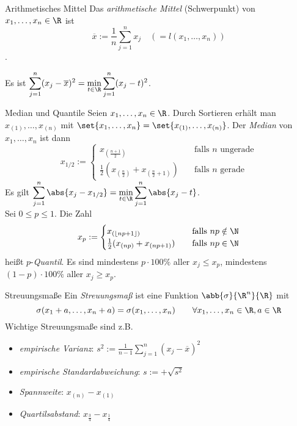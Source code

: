 \begin{karte}{Arithmetisches Mittel}
	Das \textit{arithmetische Mittel} (Schwerpunkt) von $x_1,\dotsc,x_n \in \R$ ist $$ \overline{x} := \frac{1}{n}\sum_{j=1}^{n} x_j \quad (= l(x_1,\dotsc,x_n))$$.
	
	Es ist $\displaystyle \sum_{j=1}^{n} (x_j-\overline{x})^2 = 
	\min_{t \in \R} \sum_{j=1}^{n} (x_j-t)^2$.
\end{karte}
\begin{karte}{Median und Quantile}
	Seien $x_1,\dotsc,x_n \in \R$. Durch Sortieren erhält man $ x_{(1)},\dotsc,x_{(n)}$ mit $\set{x_1,\dotsc,x_n} = \set{x_{(1)},\dotsc,x_{(n)}}$. Der \textit{Median} von $x_1,\dotsc,x_n$ ist dann
	$$x_{1/2}:= \begin{cases}
	x_{(\frac{n+1}{2})} & \quad \text{falls } n \text{ ungerade} \\
	\frac{1}{2}(x_{(\frac{n}{2})}+x_{(\frac{n}{2}+1)}) & \quad \text{falls } n \text{ gerade}
	\end{cases}$$
	Es gilt $\displaystyle \sum_{j=1}^{n} \abs{x_j - x_{1/2}} = \min_{t \in \R} \sum_{j=1}^{n} \abs{x_j-t}$. \\
	Sei $0 \le p \le 1$. Die Zahl
	$$x_p:= \begin{cases}
	x_{(\lfloor np+1 \rfloor)} & \quad \text{falls } np \notin \N \\
	\frac{1}{2}(x_{(np)}+x_{(np+1)}) & \quad \text{falls } np \in \N
	\end{cases}$$ heißt $p$-\textit{Quantil}. Es sind mindestens $p\cdot 100 \% $ aller $x_j \leq x_p$, mindestens $(1-p)\cdot 100 \%$ aller $x_j \geq x_p$.
\end{karte}

\begin{karte}{Streuungsmaße}
	Ein \textit{Streuungsmaß} ist eine Funktion $\abb{\sigma}{\R^n}{\R}$ mit $$\sigma(x_1+a,\dotsc,x_n+a) = \sigma(x_1,\dotsc,x_n) \qquad \forall x_1,\dotsc,x_n \in \R, a \in \R$$
	Wichtige Streuungsmaße sind z.B.
	\begin{itemize}
		\item \textit{empirische Varianz}: $\displaystyle s^2:=\frac{1}{n-1} \sum_{j=1}^{n} (x_j-\overline{x})^2$
		\item \textit{empirische Standardabweichung}: $s :=+\sqrt{s^2}$
		\item \textit{Spannweite}: $x_{(n)}-x_{(1)}$
		\item \textit{Quartilsabstand}: $x_{\frac{3}{4}}-x_{\frac{1}{4}}$
	\end{itemize}
\end{karte}


